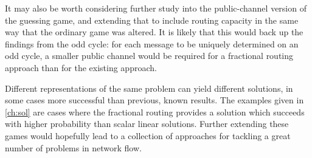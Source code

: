 It may also be worth considering further study into the public-channel version of the guessing game, and extending that to include routing capacity in the same way that the ordinary game was altered. It is likely that this would back up the findings from the odd cycle: for each message to be uniquely determined on an odd cycle, a smaller public channel would be required for a fractional routing approach than for the existing approach.

Different representations of the same problem can yield different solutions, in some cases more successful than previous, known results. The examples given in \autoref{ch:sol} are cases where the fractional routing provides a solution which succeeds with higher probability than scalar linear solutions. Further extending these games would hopefully lead to a collection of approaches for tackling a great number of problems in network flow.